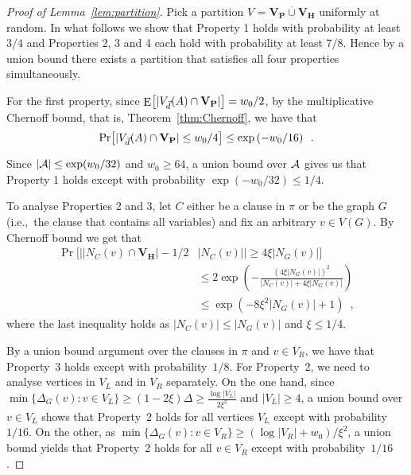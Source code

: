 \documentclass{theoretics}
\providecommand{\abs}[1]{\lvert#1\rvert}
\newcommand{\minofset}[3][:]{\min \{ #2 #1 #3 \}}
\DeclareMathOperator{\Expop}{E}
\newcommand{\Prob}[2][]{\Pr_{#1} \bigl[ #2 \bigr]}
\newcommand{\Expectation}[2][]{\Expop_{#1} \bigl[ #2 \bigr]}
\newcommand{\Setsize}[1]{\bigl\lvert#1\bigr\rvert}
\newcommand{\setsize}[1]{\lvert#1\rvert}
\newcommand{\disjointunion}{\overset{.}{\cup}}
\newcommand{\eqperiod}{\enspace .}
\newcommand{\eqcomma}{\enspace ,}
\newcommand{\ie}{i.e.,\ }
\newcommand{\refthm}[1]{Theorem~\ref{#1}}
\newcommand{\refpi}{\pi}
\newcommand{\neigh}[2][]{N_{{#1}}(#2)}
\renewcommand{\deg}[2][XXXXXXXXXXXX]{\Delta_{#1}(#2)}
\newcommand{\diff}{\xi}
\newcommand{\GdegMax}{\Delta}
\newcommand{\V}[1][]{V_{#1}}
\newcommand{\Vl}{\V[L]}
\newcommand{\Vr}{\V[R]}
\newcommand{\Vp}{\V[P]}
\newcommand{\Vh}{\V[H]}
\newcommand{\Ax}{\ensuremath\mathcal{A}}
\newcommand{\vecthr}{\vec{d}}
\newcommand{\Vfat}[1]{\ensuremath V_{\vecthr}(#1)}
\numberwithin{equation}{section}
\begin{document}
\begin{proof}[Proof of Lemma~\ref{lem:partition}]
  Pick a partition $\V = \mathbf{\Vp} \disjointunion \mathbf{\Vh}$
  uniformly at random.  In what follows we show that Property 1 holds
  with probability at least $3/4$ and Properties 2, 3 and 4 each hold
  with probability at least $7/8$.  Hence by a union bound there
  exists a partition that satisfies all four properties
  simultaneously.
  
  For the first property, since
  $\Expectation{ \setsize{ \Vfat{A} \cap \mathbf{\Vp} } } = w_0/2$, by
  the multiplicative Chernoff bound, that is, \refthm{thm:Chernoff}, we have
  that
  \begin{align}
    \Prob{ \setsize{ \Vfat{A} \cap \mathbf{\Vp} } \le w_0/4 } 
    \le \exp\left(-w_0 / 16\right) \eqperiod
  \end{align}
  Since $\setsize{\Ax} \leq \exp(w_0/32)$ and $w_0 \geq 64$,
  a union bound over $\Ax$ gives 
  us that Property 1 holds except with probability 
  $\exp(-w_0/32)\leq 1/4$.
	
  To analyse Properties 2 and 3,
  let $C$ either be a clause in $\refpi$
  or be the graph $G$ (\ie the clause that
  contains all variables)
  and fix an arbitrary $v \in V(G)$. By Chernoff bound we get that 
  \begin{align}
  \nonumber
    \Prob{ \Setsize{ \setsize{ \neigh[C]{v} \cap \mathbf{\Vh} } - 
    1/2 &\setsize{\neigh[C]{v}} }
    \ge
    4 \diff \abs{ \neigh[G]{v} } }\\\nonumber
    &\le 
      2 \exp \left( -  
      \frac{(4\diff \abs{ \neigh[G]{v} })^2}{ \setsize{\neigh[C]{v}} + 
      4 \diff \abs{ \neigh[G]{v} } } 
      \right) \\		
    &\le \exp \left( - 8
      \diff^2 \abs{ \neigh[G]{v} }
      + 1\right)\eqcomma
  \end{align}
  where the last inequality holds as 
  $ \setsize{\neigh[C]{v}} \leq  \setsize{\neigh[G]{v}}$ and $\diff \leq 1/4$.
  
  
  
  By a union bound argument over the clauses in $\refpi$ and $v \in \Vr$,
  we have that Property~3 holds except with probability~$1/8$.
  For Property~2, we need to analyse vertices in $\Vl$ and in $\Vr$ separately.
  On the one hand, since $\minofset{\deg[G]{v}}{v\in \Vl} \geq (1-2\diff)\GdegMax \geq 
  \frac{\log \setsize{\Vl}}{2\diff^2}$ and $\setsize{\Vl} \ge 4$,
  a union bound over 
  $v\in \Vl$ shows
  that Property~2 holds for all vertices $\Vl$ except with 
  probability~$1/16$.
  On the other, as
  $\minofset{\deg[G]{v}}{v\in \Vr} \geq (\log \setsize{\Vr} + w_0 )/\diff^2$,
  a union bound yields that Property~2 holds for all $v \in \Vr$
  except with probability~$1/16$.





\end{proof}
\end{document}
